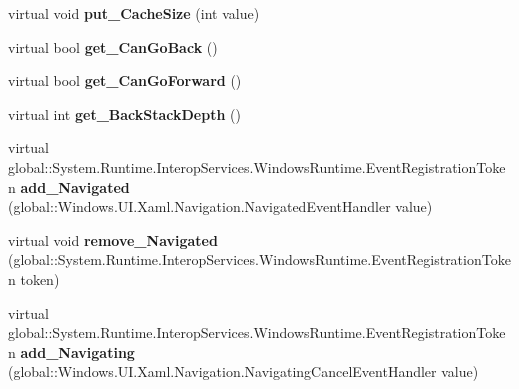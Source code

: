 \begin{DoxyCompactItemize}
\item 
\mbox{\label{class_windows_1_1_u_i_1_1_xaml_1_1_controls_1_1_frame_af1e1e012518d0402becbf9239646174d}} 
virtual void {\bfseries put\+\_\+\+Cache\+Size} (int value)
\item 
\mbox{\label{class_windows_1_1_u_i_1_1_xaml_1_1_controls_1_1_frame_ab2b52e19abf5dd97c35d8e4da92c57db}} 
virtual bool {\bfseries get\+\_\+\+Can\+Go\+Back} ()
\item 
\mbox{\label{class_windows_1_1_u_i_1_1_xaml_1_1_controls_1_1_frame_a85c6c5e01ec4c931d0b6f7752ea62bc4}} 
virtual bool {\bfseries get\+\_\+\+Can\+Go\+Forward} ()
\item 
\mbox{\label{class_windows_1_1_u_i_1_1_xaml_1_1_controls_1_1_frame_ac2a0cbed74e7e3a18163cbcb7a34def2}} 
virtual int {\bfseries get\+\_\+\+Back\+Stack\+Depth} ()
\item 
\mbox{\label{class_windows_1_1_u_i_1_1_xaml_1_1_controls_1_1_frame_a38b94e8bce03524a1c9b3c012074a6e8}} 
virtual global\+::\+System.\+Runtime.\+Interop\+Services.\+Windows\+Runtime.\+Event\+Registration\+Token {\bfseries add\+\_\+\+Navigated} (global\+::\+Windows.\+U\+I.\+Xaml.\+Navigation.\+Navigated\+Event\+Handler value)
\item 
\mbox{\label{class_windows_1_1_u_i_1_1_xaml_1_1_controls_1_1_frame_a6ba58ec5fb87b903e976124fe13e19c0}} 
virtual void {\bfseries remove\+\_\+\+Navigated} (global\+::\+System.\+Runtime.\+Interop\+Services.\+Windows\+Runtime.\+Event\+Registration\+Token token)
\item 
\mbox{\label{class_windows_1_1_u_i_1_1_xaml_1_1_controls_1_1_frame_afe49379e4ea3f7d217517f9ee7ba2bf9}} 
virtual global\+::\+System.\+Runtime.\+Interop\+Services.\+Windows\+Runtime.\+Event\+Registration\+Token {\bfseries add\+\_\+\+Navigating} (global\+::\+Windows.\+U\+I.\+Xaml.\+Navigation.\+Navigating\+Cancel\+Event\+Handler value)
\item 

\end{DoxyCompactItemize}
